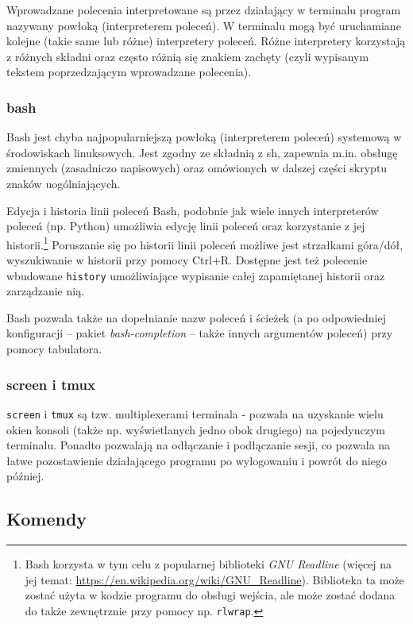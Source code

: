 Wprowadzane polecenia interpretowane są przez działający w terminalu program nazywany powłoką (interpreterem poleceń).
W terminalu mogą być uruchamiane kolejne (takie same lub różne) interpretery poleceń.
Różne interpretery korzystają z różnych składni oraz często różnią się znakiem zachęty (czyli wypisanym tekstem poprzedzającym wprowadzane polecenia).

\subsubsection{bash}
Bash jest chyba najpopularniejszą powłoką (interpreterem poleceń) systemową w środowiskach linuksowych.
Jest zgodny ze składnią z sh, zapewnia m.in. obsługę zmiennych (zasadniczo napisowych) oraz omówionych w dalszej części skryptu znaków uogólniających.

\begin{ProTip}[breakable]{Edycja i historia linii poleceń}
Bash, podobnie jak wiele innych interpreterów poleceń (np. Python) umożliwia edycję linii poleceń oraz korzystanie z jej historii.\footnote{
	Bash korzysta w tym celu z popularnej biblioteki \textit{GNU Readline} (więcej na jej temat: \url{https://en.wikipedia.org/wiki/GNU\_Readline}).
	Biblioteka ta może zostać użyta w kodzie programu do obsługi wejścia, ale może zostać dodana do także zewnętrznie przy pomocy np. \Verb$rlwrap$.
}
Poruszanie się po historii linii poleceń możliwe jest strzałkami góra/dół, wyszukiwanie w historii przy pomocy Ctrl+R.
Dostępne jest też polecenie wbudowane \texttt{history} umożliwiające wypisanie całej zapamiętanej historii oraz zarządzanie nią.

Bash pozwala także na dopełnianie nazw poleceń i ścieżek (a po odpowiedniej konfiguracji – pakiet \textit{bash-completion} – także innych argumentów poleceń) przy pomocy tabulatora.
\end{ProTip}

\subsubsection{screen i tmux}
\texttt{screen} i \texttt{tmux} są tzw. multiplexerami terminala - pozwala na uzyskanie wielu okien konsoli (także np. wyświetlanych jedno obok drugiego) na pojedynczym terminalu.
Ponadto pozwalają na odłączanie i podłączanie sesji, co pozwala na łatwe pozostawienie działającego programu po wylogowaniu i powrót do niego później.

\subsection{Komendy}

